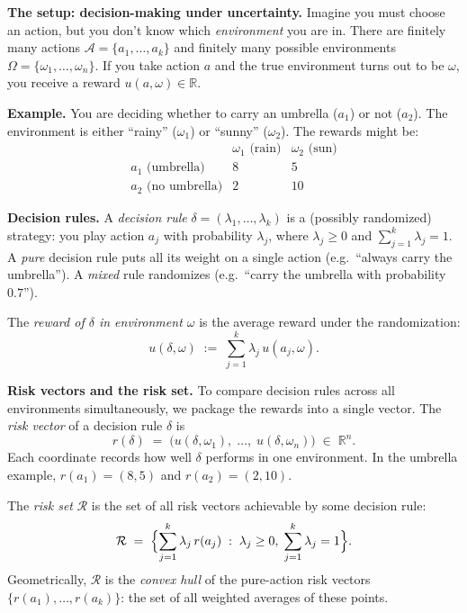 \documentclass[8pt]{article}
\begin{document}
\noindent
\textbf{The setup: decision-making under uncertainty.} Imagine you must choose an
action, but you don't know which \emph{environment} you are in. There are finitely
many actions $\mathcal{A} = \{a_1, \ldots, a_k\}$ and finitely many possible
environments $\Omega = \{\omega_1, \ldots, \omega_n\}$. If you take action $a$ and the
true environment turns out to be $\omega$, you receive a reward
$u(a, \omega) \in \mathbb{R}$.

\medskip
\noindent
\textbf{Example.} You are deciding whether to carry an umbrella ($a_1$) or not
($a_2$). The environment is either ``rainy'' ($\omega_1$) or ``sunny'' ($\omega_2$).
The rewards might be:
\[
\begin{array}{c|cc}
 & \omega_1 \text{ (rain)} & \omega_2 \text{ (sun)} \\
\hline
a_1 \text{ (umbrella)} & 8 & 5 \\
a_2 \text{ (no umbrella)} & 2 & 10
\end{array}
\]

\medskip
\noindent
\textbf{Decision rules.} A \emph{decision rule}
$\delta = (\lambda_1, \ldots, \lambda_k)$ is a (possibly randomized) strategy: you
play action $a_j$ with probability $\lambda_j$, where $\lambda_j \geq 0$ and
$\sum_{j=1}^k \lambda_j = 1$. A \emph{pure} decision rule puts all its weight on a
single action (e.g.\ ``always carry the umbrella''). A \emph{mixed} rule randomizes
(e.g.\ ``carry the umbrella with probability $0.7$'').

\medskip
\noindent
The \emph{reward of $\delta$ in environment $\omega$} is the average reward under
the randomization:
\[
  u(\delta, \omega) \;:=\; \sum_{j=1}^k \lambda_j\, u(a_j, \omega).
\]

\medskip
\noindent
\textbf{Risk vectors and the risk set.} To compare decision rules across all
environments simultaneously, we package the rewards into a single vector. The
\emph{risk vector} of a decision rule $\delta$ is
\[
  r(\delta) \;=\; \bigl(u(\delta, \omega_1),\; \ldots,\; u(\delta, \omega_n)\bigr)
  \;\in\; \mathbb{R}^n.
\]
Each coordinate records how well $\delta$ performs in one environment. In the umbrella
example, $r(a_1) = (8, 5)$ and $r(a_2) = (2, 10)$.

\medskip
\noindent
The \emph{risk set} $\mathcal{R}$ is the set of all risk vectors achievable by some
decision rule:
\[
  \mathcal{R} \;=\; \Bigl\{\sum_{j=1}^k \lambda_j\, r(a_j) \;:\;
  \lambda_j \geq 0,\; \sum_{j=1}^k \lambda_j = 1\Bigr\}.
\]
Geometrically, $\mathcal{R}$ is the \emph{convex hull} of the pure-action risk
vectors $\{r(a_1), \ldots, r(a_k)\}$: the set of all weighted averages of these
points.
\end{document}

